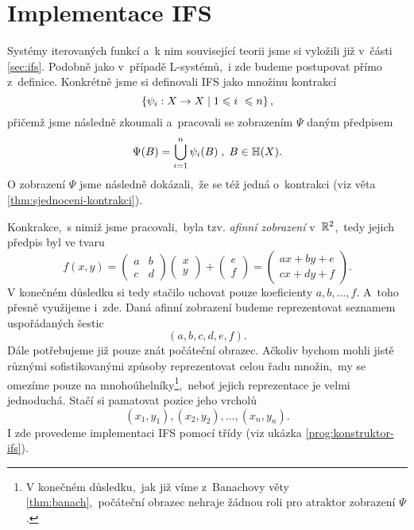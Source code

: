 \section{Implementace IFS}\label{sec:implementace-ifs}

Systémy iterovaných funkcí a~k nim související teorii jsme si vyložili již v~části \ref{sec:ifs}. Podobně jako v~případě L-systémů,~i zde budeme postupovat přímo z~definice. Konkrétně jsme si definovali IFS jako množinu kontrakcí
\[\left\{\psi_i:X \rightarrow X\mid 1\leqslant i~\leqslant n\right\},\]
přičemž jsme následně zkoumali a~pracovali se zobrazením $\Psi$ daným předpisem
\[\Psi(B)=\bigcup_{i=1}^n\psi_i(B)\;,\;B\in\mathbb{H}(X).\]
O zobrazení $\Psi$ jsme následně dokázali,~že se též jedná o~kontrakci (viz věta \ref{thm:sjednoceni-kontrakci}).

Konkrakce,~s nimiž jsme pracovali,~byla tzv. \emph{afinní zobrazení} v~$\mathbb{R}^2$,~tedy jejich předpis byl ve tvaru
\begin{equation}\label{eq:afinni-zobrazeni}
    f(x,y)=\left(\begin{matrix}
        a & b\\
        c & d
    \end{matrix}\right)\left(\begin{matrix}
        x\\
        y
    \end{matrix}\right)+\left(\begin{matrix}
        e\\
        f
    \end{matrix}\right)=\left(\begin{matrix}
        ax+by+e\\
        cx+dy+f
    \end{matrix}\right).
\end{equation}
V konečném důsledku si tedy stačilo uchovat pouze koeficienty $a,b,\ldots,f$. A~toho přesně využijeme i~zde. Daná afinní zobrazení budeme reprezentovat seznamem uspořádaných šestic
\[(a,b,c,d,e,f).\]
Dále potřebujeme již pouze znát počáteční obrazec. Ačkoliv bychom mohli jistě různými sofistikovanými způsoby reprezentovat celou řadu množin,~my se omezíme pouze na mnohoúhelníky\footnote{V konečném důsledku,~jak již víme z~Banachovy věty \ref{thm:banach},~počáteční obrazec nehraje žádnou roli pro atraktor zobrazení $\Psi$.},~neboť jejich reprezentace je velmi jednoduchá. Stačí si pamatovat pozice jeho vrcholů
\[(x_1,y_1),(x_2,y_2),\ldots,(x_n,y_n).\]
I zde provedeme implementaci IFS pomocí třídy (viz ukázka \ref{prog:konstruktor-ifs}).
